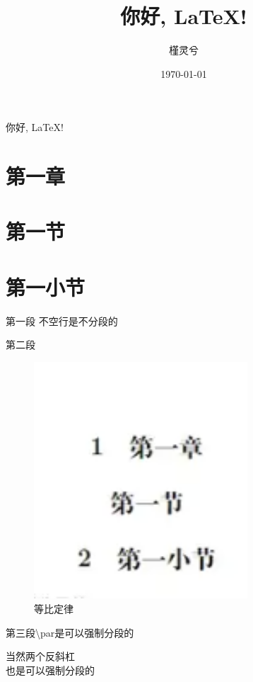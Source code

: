 \documentclass[UTF8]{ctexart}
\title{你好, LaTeX!}
\author{槿灵兮}
\date{\today}
\begin{document}
\maketitle

\tableofcontents


你好, LaTeX!

\section{第一章}

\section*{第一节}

\section{第一小节}
第一段
不空行是不分段的

第二段

\begin{figure}[htbp]
    \centering
    \includegraphics[width=8cm]{tu1.png}
    \caption{等比定律}
\end{figure}

第三段\textbackslash par是可以强制分段的 %

当然两个反斜杠\\也是可以强制分段的
\end{document}
